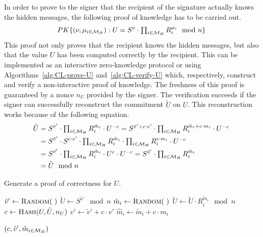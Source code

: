 In order to prove to the signer that the recipient of the signature actually
knows the hidden messages, the following proof of knowledge has to be carried out.
\begin{equation*}
  PK\{(\nu, \mu_{i \in \mathcal{M}_H}) :
    U = S^{\nu} \cdot \textstyle\prod_{i \in \mathcal{M}_H} R_i^{\mu_i} \mod n\}
\end{equation*}
This proof not only proves that the recipient knows the hidden messages, but
also that the value $U$ has been computed correctly by the recipient. This can
be implemented as an interactive zero-knowledge protocol or using
Algorithms~\ref{alg:CL-prove-U} and~\ref{alg:CL-verify-U} which, respectively,
construct and verify a non-interactive proof of knowledge. The freshness of this
proof is guaranteed by a nonce $n_U$ provided by the signer. The verification
succeeds if the signer can successfully reconstruct the commitment $\tilde{U}$
on $U$. This reconstruction works because of the following equation.
\begin{align*}
  \hat{U}
  & = S^{\hat{v}'} \cdot \textstyle \prod_{i \in \mathcal{M}_H} R_i^{\hat{m}_i}
    \cdot U^{-c}
    = S^{\tilde{v}' + c \cdot v'} \cdot
    \textstyle\prod_{i \in \mathcal{M}_H} R_i^{\tilde{m}_i + c \cdot m_i}
    \cdot U^{-c} \\
  & = S^{\tilde{v}'} \cdot S^{c \cdot v'}
    \cdot \textstyle\prod_{i \in \mathcal{M}_H} R_i^{\tilde{m}_i}
    \cdot \textstyle\prod_{i \in \mathcal{M}_H} R_i^{c \cdot m_i}
    \cdot U^{-c}  \\
  & = S^{\tilde{v}'}
    \cdot \textstyle\prod_{i \in \mathcal{M}_H} R_i^{\tilde{m}_i}
    \cdot U^c \cdot U^{-c}
    = S^{\tilde{v}'} \cdot \textstyle\prod_{i \in \mathcal{M}_H} R_i^{\tilde{m}_i} \\
  & = \tilde{U} \mod n
\end{align*}

\begin{algorithm}
  \caption{Generate a proof of correctness for $U$.}
  \label{alg:CL-prove-U}
  \addtolength{\baselineskip}{1mm}
  \begin{algorithmic}[1]
      \State $\tilde{v}' \gets \Call{Random}{~}$
      \State $\tilde{U} \gets S^{\tilde{v}'} \mod n$
        \State $\tilde{m}_i \gets \Call{Random}{~}$
        \State $\tilde{U} \gets \tilde{U} \cdot R_i^{\tilde{m}_i} \mod n$
      \EndFor
      \State $c \gets \Call{Hash}{U, \tilde{U}, n_U}$
      \State $\hat{v}' \gets \tilde{v}' + c \cdot v'$
        \State $\hat{m}_i \gets \tilde{m}_i + c \cdot m_i$
      \EndFor

      \Return $(c, \hat{v}', \hat{m}_{i \in \mathcal{M}_H})$
    \EndFunction
  \end{algorithmic}
\end{algorithm}

